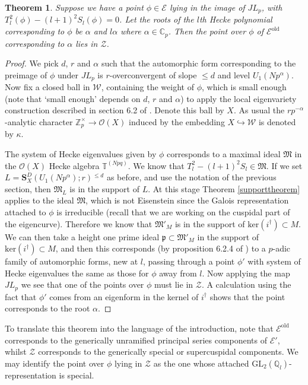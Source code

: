 \documentclass[a4paper, notitlepage]{amsart}
\newcommand{\Z}{\ensuremath{\mathbb{Z}}\xspace}
\newcommand{\Q}{\ensuremath{\mathbb{Q}}\xspace}
\newcommand{\C}{\ensuremath{\mathbb{C}}\xspace}
\newcommand{\OO}{\ensuremath{\mathscr{O}}\xspace}
\newtheorem{theorem}{Theorem}
\newcommand{\OCN}{\ensuremath{\mathbf{S}^D_{X}(U_1(Np^\alpha);r)}\xspace}
\newcommand{\s}{\ensuremath{^{\leq d}}\xspace}
\newcommand{\UU}{\ensuremath{U_1(Np^\alpha)}\xspace}
\begin{document}
\begin{theorem}\label{raise}
Suppose we have a point $\phi \in \mathscr{E}$ lying in the image of $JL_p$, with $T_l^2(\phi)-(l+1)^2S_l(\phi)=0$. Let the roots of the $l$th Hecke polynomial corresponding to $\phi$ be $\alpha$ and $l \alpha$ where $\alpha \in \C_p$. Then the point over $\phi$ of $\mathscr{E}^\mathrm{old}$ corresponding to $\alpha$ lies in $\mathscr{Z}$.
\end{theorem}
\begin{proof}

We pick $d$, $r$ and $\alpha$ such that the automorphic form corresponding to the preimage of $\phi$ under $JL_p$ is $r$-overconvergent of slope $\le d$ and level $\UU$. Now fix a closed ball in $\mathscr{W}$, containing the weight of $\phi$, which is small enough (note that `small enough' depends on $d$, $r$ and $\alpha$) to apply the local eigenvariety construction described in section 6.2 of \cite{Chenun}. Denote this ball by $X$. As usual the $rp^{-\alpha}$-analytic character $\Z_p^\times \rightarrow \OO(X)$ induced by the embedding $X \hookrightarrow \mathscr{W}$ is denoted by $\kappa$. 
 
The system of Hecke eigenvalues given by $\phi$ corresponds to a maximal ideal $\mathfrak{M}$ in the $\OO(X)$ Hecke algebra $\mathbb{T}^{(Npq)}$. We know that $T_l^2-(l+1)^2S_l \in \mathfrak{M}$. If we set $L=\OCN\s$ as before, and use the notation of the previous section, then $\mathfrak{M}_L$ is in the support of $L$. At this stage Theorem \ref{supporttheorem} applies to the ideal $\mathfrak{M}$, which is not Eisenstein since the Galois representation attached to $\phi$ is irreducible (recall that we are working on the cuspidal part of the eigencurve). Therefore we know that $\mathfrak{M}'_M$ is in the support of $\mathrm{ker}(i^\dagger)\subset M$. We can then take a height one prime ideal $\mathfrak{p}\subset \mathfrak{M}'_M$ in the support of $\mathrm{ker}(i^\dagger)\subset M$, and then this corresponds (by proposition 6.2.4 of \cite{Chenun}) to a $p$-adic family of automorphic forms, new at $l$, passing through a point $\phi'$ with system of Hecke eigenvalues the same as those for $\phi$ away from $l$. Now applying the map $JL_p$ we see that one of the points over $\phi$ must lie in $\mathscr{Z}$. A calculation using the fact that $\phi'$ comes from an eigenform in the kernel of $i^\dagger$ shows that the point corresponds to the root $\alpha$.
\end{proof}
To translate this theorem into the language of the introduction, note that $\mathscr{E}^\mathrm{old}$ corresponds to the generically unramified principal series components of $\mathscr{E}'$, whilst $\mathscr{Z}$ corresponds to the generically special or supercuspidal components. We may identify the point over $\phi$ lying in $\mathscr{Z}$ as the one whose attached $\mathrm{GL}_2(\Q_l)$-representation is special. 
\end{document}
